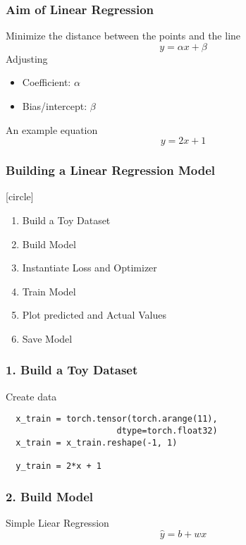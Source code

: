 \documentclass[14 pt]{beamer}
\let\olditem\item
\renewcommand{\item}{\olditem\vspace{4pt}}
\begin{document}
\begin{frame}
  \frametitle{Aim of Linear Regression}
   Minimize the distance between the points and the line
    \begin{displaymath}
      y = \alpha x + \beta
    \end{displaymath}
   Adjusting
   \begin{itemize}
   \item Coefficient: $\alpha$ 
   \item  Bias/intercept: $\beta$
  \end{itemize}
  \begin{block}{An example equation}
  \begin{displaymath}
    y = 2x + 1
  \end{displaymath}
\end{block}
\end{frame}

\begin{frame}
      \frametitle{Building a Linear Regression Model }
     [circle]
      \begin{enumerate}
      \item Build a Toy Dataset
      \item Build Model
      \item Instantiate Loss and Optimizer
      \item Train Model
      \item Plot predicted and Actual Values
      \item Save Model
      \end{enumerate}
\end{frame}

\begin{frame}[fragile]
    \frametitle{1. Build a Toy Dataset}
    \begin{block}{Create data}
\begin{verbatim}
  x_train = torch.tensor(torch.arange(11), 
                      dtype=torch.float32)
  x_train = x_train.reshape(-1, 1)

  y_train = 2*x + 1
\end{verbatim}
    \end{block}
\end{frame}

\begin{frame}[fragile]
  \frametitle{2. Build Model}
  
\end{frame}

\begin{frame}{Simple Liear Regression}
  \begin{equation}
    \hat{y} = b + wx
  \end{equation}
\end{frame}
\end{document}

